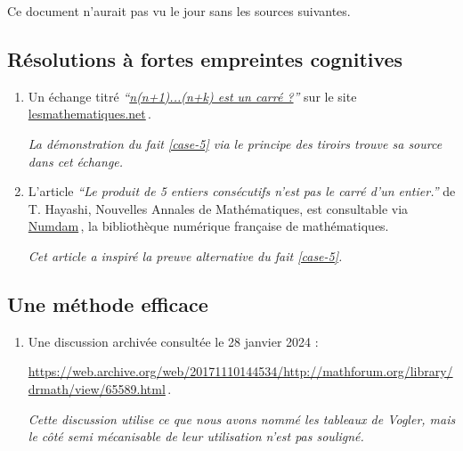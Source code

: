 	



Ce document n'aurait pas vu le jour sans les sources suivantes.




\subsection{Résolutions à fortes empreintes cognitives}

\leavevmode
\smallskip

\begin{enumerate}
	\item Un échange titré \emph{\enquote{\href{https://les-mathematiques.net/vanilla/discussion/comment/351293}{n(n+1)...(n+k) est un carré ?}}} sur le site \url{lesmathematiques.net}\,.
	
	\smallskip
	\noindent
	\emph{La démonstration du fait \ref{case-5}  via le principe des tiroirs trouve sa source dans cet échange.}


	\item L'article \emph{\enquote{Le produit de 5 entiers consécutifs n'est pas le carré d'un entier.}} de T. Hayashi, Nouvelles Annales de Mathématiques, est consultable via \href{https://numdam.org}{Numdam}\,, la bibliothèque numérique française de mathématiques.
	
	\smallskip
	\noindent
	\emph{Cet article a inspiré la preuve alternative du fait \ref{case-5}.}
\end{enumerate}




\subsection{Une méthode efficace}

\leavevmode
\smallskip

\begin{enumerate}
	\item Une discussion archivée consultée le 28 janvier 2024 : 
	
	\noindent
	\url{https://web.archive.org/web/20171110144534/http://mathforum.org/library/drmath/view/65589.html}\,.
	
	\smallskip
	\noindent
	\emph{Cette discussion utilise ce que nous avons nommé les tableaux de Vogler, mais le côté semi mécanisable de leur utilisation n'est pas souligné.}
\end{enumerate}